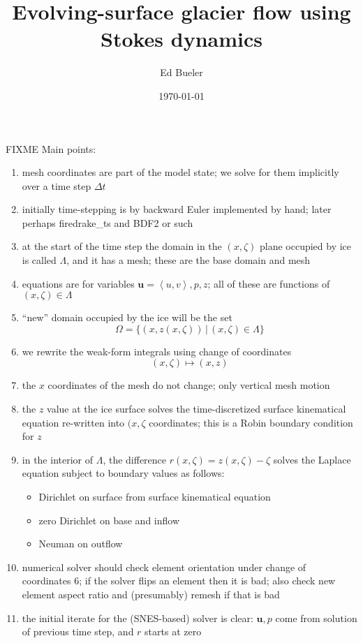 \documentclass[letterpaper,final,12pt,reqno]{amsart}
\newcommand{\bu}{\mathbf{u}}
\begin{document}
\graphicspath{{figures/}}

\title{Evolving-surface glacier flow using Stokes dynamics}

\author{Ed Bueler}

\maketitle

\date{\today}

\thispagestyle{empty}
\bigskip

FIXME Main points:
\renewcommand{\labelenumi}{\arabic{enumi}.}
\begin{enumerate}
\item mesh coordinates are part of the model state; we solve for them implicitly over a time step $\Delta t$
\item initially time-stepping is by backward Euler implemented by hand; later perhaps firedrake\_ts and BDF2 or such
\item at the start of the time step the domain in the $(x,\zeta)$ plane occupied by ice is called $\Lambda$, and it has a mesh; these are the base domain and mesh
\item equations are for variables $\bu=\left<u,v\right>,p,z$; all of these are functions of $(x,\zeta) \in \Lambda$
\item ``new'' domain occupied by the ice will be the set
    $$\Omega = \{(x,z(x,\zeta)) \,\big|\, (x,\zeta) \in \Lambda\}$$
\item we rewrite the weak-form integrals using change of coordinates
    $$(x,\zeta) \mapsto (x,z)$$
\item the $x$ coordinates of the mesh do not change; only vertical mesh motion
\item the $z$ value at the ice surface solves the time-discretized surface kinematical equation re-written into $(x,\zeta$ coordinates; this is a Robin boundary condition for $z$
\item in the interior of $\Lambda$, the difference $r(x,\zeta)=z(x,\zeta)-\zeta$ solves the Laplace equation subject to boundary values as follows:
    \begin{itemize}
    \item Dirichlet on surface from surface kinematical equation
    \item zero Dirichlet on base and inflow
    \item Neuman on outflow
    \end{itemize}
\item numerical solver should check element orientation under change of coordinates 6; if the solver flips an element then it is bad; also check new element aspect ratio and (presumably) remesh if that is bad
\item the initial iterate for the (SNES-based) solver is clear: $\bu,p$ come from solution of previous time step, and $r$ starts at zero
\end{enumerate}
 
\end{document}
